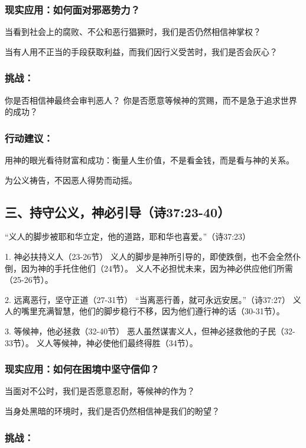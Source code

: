 \documentclass[a4paper, 12pt]{article}
\begin{document}
\subsubsection*{现实应用：如何面对邪恶势力？}
\hspace{0.6cm}当看到社会上的腐败、不公和恶行猖獗时，我们是否仍然相信神掌权？

当有人用不正当的手段获取利益，而我们因行义受苦时，我们是否会灰心？
\subsubsection*{挑战：}

你是否相信神最终会审判恶人？
你是否愿意等候神的赏赐，而不是急于追求世界的成功？
\subsubsection*{行动建议：}

\hspace{0.6cm}用神的眼光看待财富和成功：衡量人生价值，不是看金钱，而是看与神的关系。

为公义祷告，不因恶人得势而动摇。
\subsection*{三、持守公义，神必引导（诗37:23-40）}
“义人的脚步被耶和华立定，他的道路，耶和华也喜爱。”（诗37:23）

1. 神必扶持义人（23-26节）
义人的脚步是神所引导的，即使跌倒，也不会全然仆倒，因为神的手托住他们（24节）。
义人不必担忧未来，因为神必供应他们所需（25-26节）。

2. 远离恶行，坚守正道（27-31节）
“当离恶行善，就可永远安居。”（诗37:27）
义人的嘴里充满智慧，他们的脚步稳行不移，因为他们遵行神的话（30-31节）。

3. 等候神，他必拯救（32-40节）
恶人虽然谋害义人，但神必拯救他的子民（32-33节）。
义人等候神，神必使他们最终得胜（34节）。
\subsubsection*{现实应用：如何在困境中坚守信仰？}
\hspace{0.6cm}当面对不公时，我们是否愿意忍耐，等候神的作为？

当身处黑暗的环境时，我们是否仍然相信神是我们的盼望？
\subsubsection*{挑战：}
\end{document}
